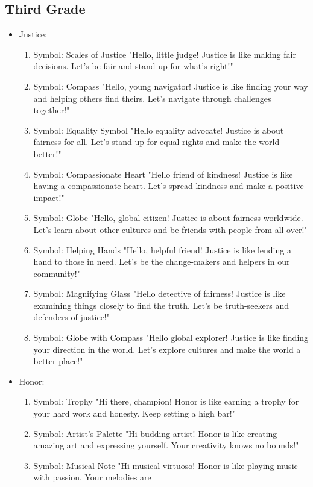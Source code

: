 \documentclass[11pt]{article}
\begin{document}
\subsection{Third Grade}
\label{sec:orgf4e6519}
\begin{itemize}
\item Justice:
\begin{enumerate}
\item Symbol: Scales of Justice
"Hello, little judge! Justice is like making fair decisions. Let's be fair and
stand up for what's right!"
\item Symbol: Compass
"Hello, young navigator! Justice is like finding your way and helping others find
theirs. Let's navigate through challenges together!"
\item Symbol: Equality Symbol
"Hello equality advocate! Justice is about fairness for all. Let's stand up for
equal rights and make the world better!"
\item Symbol: Compassionate Heart
"Hello friend of kindness! Justice is like having a compassionate heart. Let's
spread kindness and make a positive impact!"
\item Symbol: Globe
"Hello, global citizen! Justice is about fairness worldwide. Let's learn about
other cultures and be friends with people from all over!"
\item Symbol: Helping Hands
"Hello, helpful friend! Justice is like lending a hand to those in need. Let's be
the change-makers and helpers in our community!"
\item Symbol: Magnifying Glass
"Hello detective of fairness! Justice is like examining things closely to find the
truth. Let's be truth-seekers and defenders of justice!"
\item Symbol: Globe with Compass
"Hello global explorer! Justice is like finding your direction in the world. Let's
explore cultures and make the world a better place!"
\end{enumerate}
\item Honor:
\begin{enumerate}
\item Symbol: Trophy
"Hi there, champion! Honor is like earning a trophy for your hard work and
honesty. Keep setting a high bar!"
\item Symbol: Artist's Palette
"Hi budding artist! Honor is like creating amazing art and expressing yourself.
Your creativity knows no bounds!"
\item Symbol: Musical Note
"Hi musical virtuoso! Honor is like playing music with passion. Your melodies are

\end{enumerate}
\end{itemize}
\end{document}
